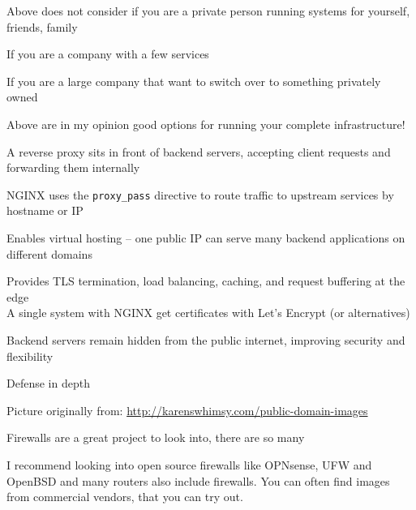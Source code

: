 \documentclass[Screen16to9,17pt]{foils}
\begin{document}
\begin{list2}
\item Above does not consider if you are a private person running systems for yourself, friends, family
\item If you are a company with a few services
\item If you are a large company that want to switch over to something privately owned
\item Above are in my opinion good options for running your complete infrastructure!
\end{list2}



\begin{list2}
\item A reverse proxy sits in front of backend servers, accepting client requests and forwarding them internally
\item NGINX uses the \verb+proxy_pass+ directive to route traffic to upstream services by hostname or IP
\item Enables virtual hosting -- one public IP can serve many backend applications on different domains
\item Provides TLS termination, load balancing, caching, and request buffering at the edge\\
A single system with NGINX get certificates with Let's Encrypt (or alternatives)
\item Backend servers remain hidden from the public internet, improving security and flexibility
\end{list2}







Defense in depth

\centerline{Picture originally from: \url{http://karenswhimsy.com/public-domain-images}}




\begin{list2}
\item Firewalls are a great project to look into, there are so many \smiley
\item I recommend looking into open source firewalls like OPNsense, UFW and OpenBSD and many routers also include firewalls. You can often find images from commercial vendors, that you can try out.
\end{list2}
\end{document}
